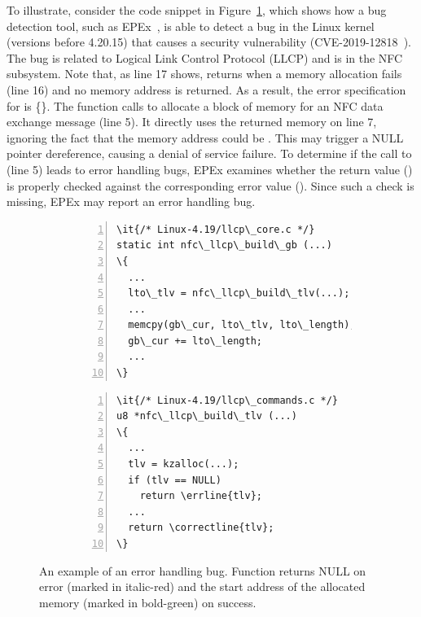\documentclass[12pt]{report}	%
\begin{document}
To illustrate, consider the code snippet in Figure~\ref{fig:errhandlingbug},
which shows how a bug detection tool, such as  EPEx~\cite{jana2016automatically},
is able to detect a bug
in the Linux kernel (versions before 4.20.15) 
that causes a security vulnerability (CVE-2019-12818~\cite{CVE:2019:12818}).
%
The bug is related to 
Logical Link Control Protocol (LLCP) and is in the NFC subsystem.
%
Note that, as line 17 shows,  returns  when a memory allocation fails (line 16) 
and no memory address is returned.
As a result, the error specification for  is
\{\}. 
%
The function  
calls 
to allocate a block of memory for an NFC data exchange message (line 5).
%
It directly uses the returned memory on line 7, ignoring the
fact that the memory address could be .
This may 
trigger a NULL pointer dereference,
causing a denial of service failure.
%
To determine if the call 
to  (line 5)
leads to error handling bugs,
EPEx examines whether the return value ()
is properly checked against the corresponding error value ().
%
%
Since such a check is missing, 
EPEx may report an error handling bug. 

\begin{figure}[t]
\centering
\begin{subfigure}[b]{0.5\textwidth}
\begin{Verbatim}[numbers=left,xleftmargin=6mm,fontsize=\footnotesize,
    commandchars=\\\{\}]
\it{/* Linux-4.19/llcp\_core.c */}
static int nfc\_llcp\_build\_gb (...)
\{
  ...
  lto\_tlv = nfc\_llcp\_build\_tlv(...);
  ...
  memcpy(gb\_cur, lto\_tlv, lto\_length);
  gb\_cur += lto\_length;
  ...
\}
\end{Verbatim}
\end{subfigure}%
\hfill
\begin{subfigure}[b]{0.5\textwidth}
\begin{Verbatim}[numbers=left,xleftmargin=6mm,fontsize=\footnotesize,
    commandchars=\\\{\},firstnumber=last]
\it{/* Linux-4.19/llcp\_commands.c */}
u8 *nfc\_llcp\_build\_tlv (...)
\{
  ...
  tlv = kzalloc(...);
  if (tlv == NULL)
    return \errline{tlv};
  ...
  return \correctline{tlv};
\}
\end{Verbatim}
\end{subfigure}
\caption{An example of an error handling bug.
Function  returns NULL on error (marked in italic-red)
and the start address of the allocated memory (marked in bold-green) on success.}
\label{fig:errhandlingbug}
\end{figure}
\end{document}
